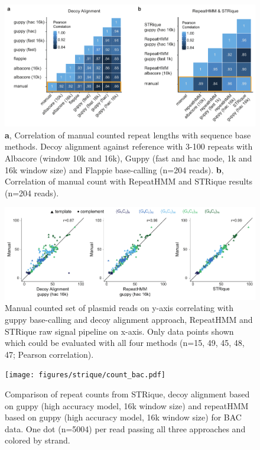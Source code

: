 \begin{figure}[h]
    \centering
    \includegraphics[width=1.0\textwidth]{figures/strique/count_sequence_corr.pdf}
    \captionsetup{format=plain}
    \caption[Correlation of sequence based STR detection methods]{\textbf{a}, Correlation of manual counted repeat lengths with sequence base methods. Decoy alignment against reference with 3-100 repeats with Albacore (window 10k and 16k), Guppy (fast and hac mode, 1k and 16k window size) and Flappie base-calling (n=204 reads). \textbf{b}, Correlation of manual count with RepeatHMM and STRique results (n=204 reads).}
    \label{fig:strique:count_sequence_corr}
\end{figure}

\begin{figure}[h]
    \centering
    \includegraphics[width=1.0\textwidth]{figures/strique/count_signal_corr.pdf}
    \captionsetup{format=plain}
    \caption[Correlation and strand bias in STR analysis methods]{Manual counted set of plasmid reads on y-axis correlating with guppy base-calling and decoy alignment approach, RepeatHMM and STRique raw signal pipeline on x-axis. Only data points shown which could be evaluated with all four methods (n=15, 49, 45, 48, 47; Pearson correlation).}
    \label{fig:strique:count_signal_corr}
\end{figure}

\begin{figure}[h]
    \centering
    \texttt{[image: figures/strique/count\_bac.pdf]}
    \captionsetup{format=plain}
    \caption[Strand bias in sequence based repeat counts]{Comparison of repeat counts from STRique, decoy alignment based on guppy (high accuracy model, 16k window size) and repeatHMM based on guppy (high accuracy model, 16k window size) for BAC data. One dot (n=5004) per read passing all three approaches and colored by strand.}
    \label{fig:strique:count_bac}
\end{figure}

